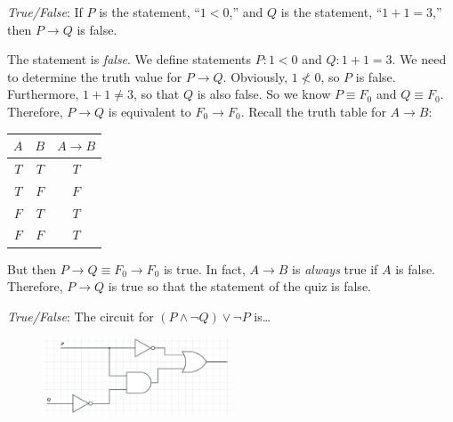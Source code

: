\documentclass[11pt,letterpaper]{article}
\begin{document}
\thispagestyle{title}

\quizsol \textit{True/False}: If $P$ is the statement, ``$1 < 0$,'' and $Q$ is the statement, ``$1 + 1= 3$,'' then $P \to Q$ is false. \pspace

\sol The statement is \textit{false}. We define statements $P \colon 1 < 0$ and $Q \colon 1 + 1= 3$. We need to determine the truth value for $P \to Q$. Obviously, $1 \not< 0$, so $P$ is false. Furthermore, $1 + 1 \neq 3$, so that $Q$ is also false. So we know $P \equiv F_0$ and $Q \equiv F_0$. Therefore, $P \to Q$ is equivalent to $F_0 \to F_0$. Recall the truth table for $A \to B$:
	\begin{table}[h]
	\centering
	\begin{tabular}{c|c||c}
	$A$ & $B$ & $A \to B$ \\ \hline
	$T$ & $T$ & $T$ \\
	$T$ & $F$ & $F$ \\
	$F$ & $T$ & $T$ \\
	$F$ & $F$ & $T$
	\end{tabular}
	\end{table}
But then $P \to Q \equiv F_0 \to F_0$ is true. In fact, $A \to B$ is \textit{always} true if $A$ is false. Therefore, $P \to Q$ is true so that the statement of the quiz is false. \pvspace{1.3cm}



\quizsol \textit{True/False}: The circuit for $(P \wedge \neg Q) \vee \neg P$ is\dots
	\begin{figure}[h]
	\centering
	\includegraphics[width=0.5\textwidth]{images/qcircuit}
	\end{figure}
\end{document}
